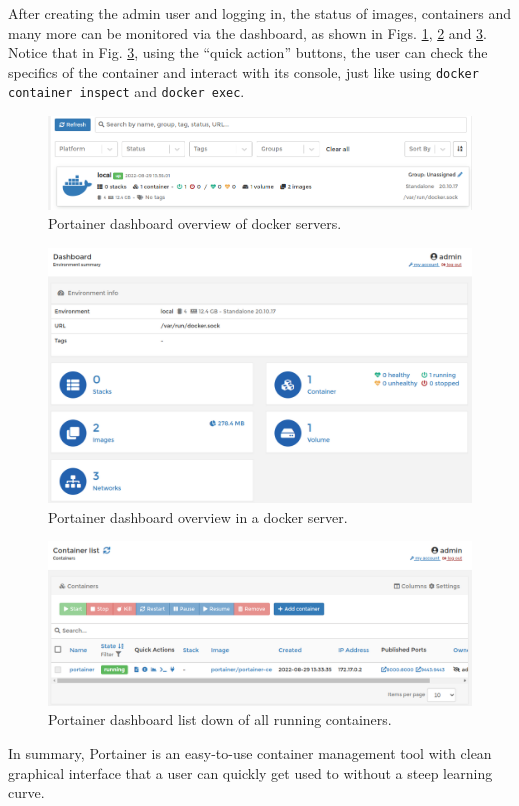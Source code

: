 After creating the admin user and logging in, the status of images, containers and many more can be monitored via the dashboard, as shown in Figs. \ref{ch:vac:fig:portainerdashboard1}, \ref{ch:vac:fig:portainerdashboard2} and \ref{ch:vac:fig:portainerdashboard3}. Notice that in Fig. \ref{ch:vac:fig:portainerdashboard3}, using the ``quick action'' buttons, the user can check the specifics of the container and interact with its console, just like using \verb|docker container inspect| and \verb|docker exec|.
\begin{figure}[!htb]
	\centering
	\includegraphics[width=350pt]{chapters/part-3/figures/portainerdashboard1.png}
	\caption{Portainer dashboard overview of docker servers.} \label{ch:vac:fig:portainerdashboard1}
\end{figure}

\begin{figure}[!htb]
	\centering
	\includegraphics[width=350pt]{chapters/part-3/figures/portainerdashboard2.png}
	\caption{Portainer dashboard overview in a docker server.} \label{ch:vac:fig:portainerdashboard2}
\end{figure}

\begin{figure}[!htb]
	\centering
	\includegraphics[width=350pt]{chapters/part-3/figures/portainerdashboard3.png}
	\caption{Portainer dashboard list down of all running containers.} \label{ch:vac:fig:portainerdashboard3}
\end{figure}

In summary, Portainer is an easy-to-use container management tool with clean graphical interface that a user can quickly get used to without a steep learning curve. 